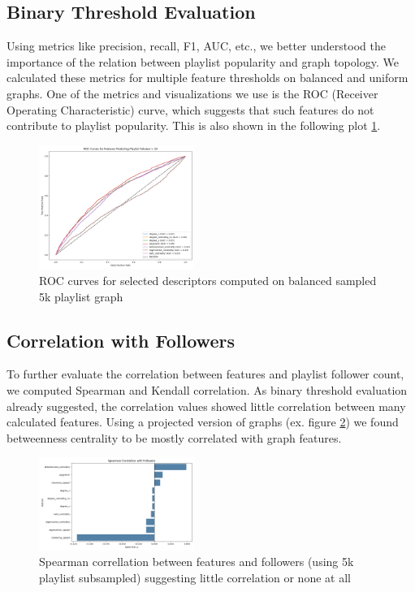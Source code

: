 \documentclass[9pt,twocolumn,twoside]{pnas-report}
\begin{document}
\subsection{Binary Threshold Evaluation}
Using metrics like precision, recall, F1, AUC, etc., we better understood the importance of the relation between playlist popularity and graph topology. We calculated these metrics for multiple feature thresholds on balanced and uniform graphs. One of the metrics and visualizations we use is the ROC (Receiver Operating Characteristic) curve, which suggests that such features do not contribute to playlist popularity. This is also shown in the following plot \ref{fig:roc}.

\begin{figure}[htbp]
\centering
\includegraphics[width=0.45\textwidth]{fig/roc_plot.png}
\caption{ROC curves for selected descriptors computed on balanced sampled 5k playlist graph}
\label{fig:roc}
\end{figure}

\subsection{Correlation with Followers}
To further evaluate the correlation between features and playlist follower count, we computed Spearman and Kendall correlation. As binary threshold evaluation already suggested, the correlation values showed little correlation between many calculated features. Using a projected version of graphs (ex. figure \ref{fig:correlation}) we found betweenness centrality to be mostly correlated with graph features.

\begin{figure}[htbp]
\centering
\includegraphics[width=0.45\textwidth]{fig/correlation_plot.png}
\caption{Spearman correllation between features and followers (using 5k playlist subsampled) suggesting little correlation or none at all}
\label{fig:correlation}
\end{figure}
\end{document}
